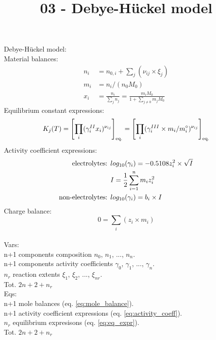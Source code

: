 \documentclass[onecolumn]{article}
\begin{document}
\title{03 - Debye-Hückel model}
\author{}
\date{}
\maketitle
Debye-Hückel model:\\
Material balances:
\begin{equation}
\begin{aligned}
\label{eq:mole_balance}
n_i &= n_{0,i} + \sum_j(\nu_{ij} \times \xi_j) \\
m_i &= n_i /(n_0 M_0) \\
x_i &= \frac{n_i}{\sum_j{n_j}}= \frac{m_i M_0}{1+\sum_{j\neq0}{m_j M_0}}
\end{aligned}
\end{equation}
Equilibrium constant expressions:
\begin{equation}
\label{eq:eq_expr}
K_j(T) = \left[ \prod_i(\gamma^{II}_i x_i)^{\nu_{ij}} \right]_{\textnormal{eq.}} =
\left[ \prod_i(\gamma^{III}_i \times m_i/m^{\circ}_i )^{\nu_{ij}} \right]_{\textnormal{eq.}}
\end{equation}
Activity coefficient expressions:
\begin{equation}
\label{eq:activity_coeff}
\begin{aligned}
\textnormal{electrolytes: } & log_{10}(\gamma_{i}) = -0.5108 z_i^2 \times \sqrt{I} \\
& I = \frac{1}{2} \sum_{i=1}^n m_i z_i^2 \\
\textnormal{non-electrolytes: } & log_{10}(\gamma_{i}) = b_i \times I
\end{aligned}
\end{equation}
Charge balance:
\begin{equation}
0 = \sum_i(z_i \times m_i)
\end{equation}
\\
Vars: \\
n+1 components composition $n_0$, $n_1$, ..., $n_n$. \\
n+1 components activity coefficients $\gamma_0$, $\gamma_1$, ..., $\gamma_n$. \\
$n_r$ reaction extents $\xi_1$, $\xi_2$, ..., $\xi_{nr}$. \\
Tot. $2n + 2 + n_r$ \\
Eqs: \\
n+1 mole balances (eq. \ref{eq:mole_balance}). \\
n+1 activity coefficient expressions (eq. \ref{eq:activity_coeff}). \\
$n_r$ equilibrium expresisons (eq. \ref{eq:eq_expr}). \\
Tot. $2n + 2 + n_r$
\end{document}

